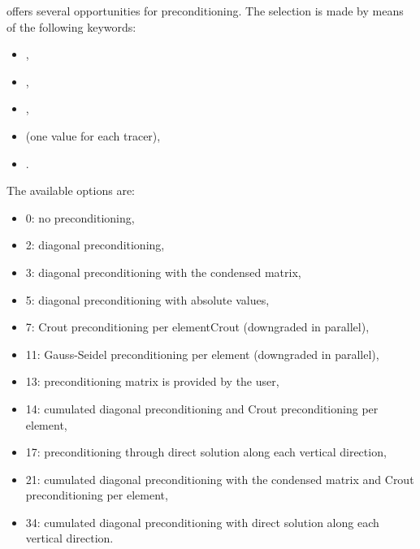  offers several opportunities for preconditioning. The selection is
made by means of the following keywords:

\begin{itemize}
\item {},

\item {},

\item {},

%
\item {} (one value for each
tracer),

\item {}.
\end{itemize}

The available options are:

\begin{itemize}
\item 0:  no preconditioning,

\item 2:  diagonal preconditioning,

\item 3:  diagonal preconditioning with the condensed matrix,

\item 5:  diagonal preconditioning with absolute values,

\item 7:  Crout preconditioning per elementCrout (downgraded in parallel),

\item 11: Gauss-Seidel preconditioning per element (downgraded in parallel),

\item 13: preconditioning matrix is provided by the user,

\item 14: cumulated diagonal preconditioning and Crout preconditioning per
element,

\item 17:  preconditioning through direct solution along each vertical
direction,

\item 21:  cumulated diagonal preconditioning with the condensed matrix and
Crout preconditioning per element,

\item 34:  cumulated diagonal preconditioning with direct solution along each
vertical direction.
\end{itemize}

